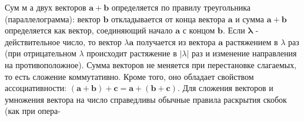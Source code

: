 \documentclass[10pt]{article}
\begin{document}
Сум м а двух векторов $\boldsymbol{a}+\boldsymbol{b}$ определяется по правилу треугольника (параллелограмма): вектор $\boldsymbol{b}$ откладывается от конца вектора $\boldsymbol{a}$ и сумма $\boldsymbol{a}+\boldsymbol{b}$ определяется как вектор, соединяющий начало $\boldsymbol{a}$ с концом $\boldsymbol{b}$. Если $\boldsymbol{\lambda}$ - действительное число, то вектор $\lambda \boldsymbol{a}$ получается из вектора $\boldsymbol{a}$ растяжением в $\lambda$ раз (при отрицательном $\lambda$ происходит растяжение в $|\lambda|$ раз и изменение направления на противоположное). Сумма векторов не меняется при перестановке слагаемых, то есть сложение коммутативно. Кроме того, оно обладает свойством ассоциативности: $(\boldsymbol{a}+\boldsymbol{b})+\boldsymbol{c}=\boldsymbol{a}+(\boldsymbol{b}+\boldsymbol{c})$. Для сложения векторов и умножения вектора на число справедливы обычные правила раскрытия скобок (как при опера-
\end{document}
